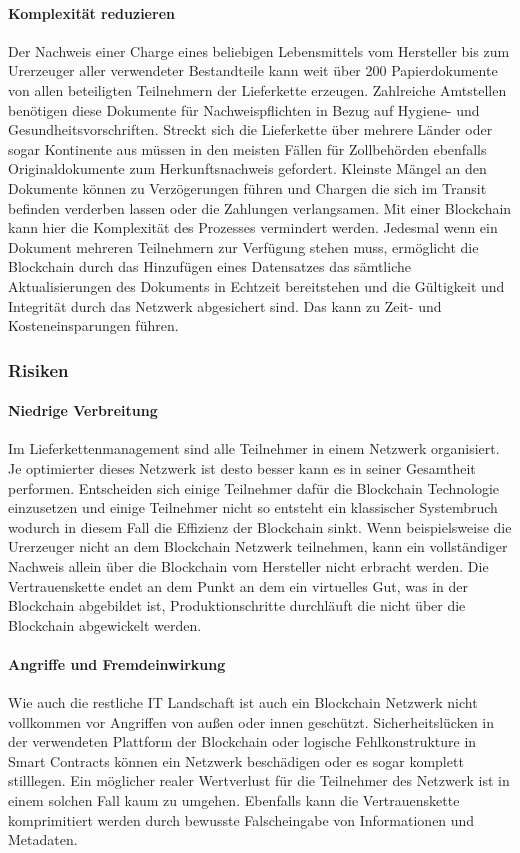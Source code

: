 \paragraph{Komplexität reduzieren}
Der Nachweis einer Charge eines beliebigen Lebensmittels vom Hersteller bis zum Urerzeuger aller verwendeter Bestandteile kann weit über 200 Papierdokumente von allen beteiligten Teilnehmern der Lieferkette erzeugen. Zahlreiche Amtstellen benötigen diese Dokumente für Nachweispflichten in Bezug auf Hygiene- und Gesundheitsvorschriften. Streckt sich die Lieferkette über mehrere Länder oder sogar Kontinente aus müssen in den meisten Fällen für Zollbehörden ebenfalls Originaldokumente zum Herkunftsnachweis gefordert. Kleinste Mängel an den Dokumente können zu Verzögerungen führen und Chargen die sich im Transit befinden verderben lassen oder die Zahlungen verlangsamen. Mit einer Blockchain kann hier die Komplexität des Prozesses vermindert werden. Jedesmal wenn ein Dokument mehreren Teilnehmern zur Verfügung stehen muss, ermöglicht die Blockchain durch das Hinzufügen eines Datensatzes das sämtliche Aktualisierungen des Dokuments in Echtzeit bereitstehen und die Gültigkeit und Integrität durch das Netzwerk abgesichert sind. Das kann zu Zeit- und Kosteneinsparungen führen.

\subsubsection{Risiken}
\paragraph{Niedrige Verbreitung}
Im Lieferkettenmanagement sind alle Teilnehmer in einem Netzwerk organisiert. Je optimierter dieses Netzwerk ist desto besser kann es in seiner Gesamtheit performen. Entscheiden sich einige Teilnehmer dafür die Blockchain Technologie einzusetzen und einige Teilnehmer nicht so entsteht ein klassischer Systembruch wodurch in diesem Fall die Effizienz der Blockchain sinkt. Wenn beispielsweise die Urerzeuger nicht an dem Blockchain Netzwerk teilnehmen, kann ein vollständiger Nachweis allein über die Blockchain vom Hersteller nicht erbracht werden. Die Vertrauenskette endet an dem Punkt an dem ein virtuelles Gut, was in der Blockchain abgebildet ist, Produktionschritte durchläuft die nicht über die Blockchain abgewickelt werden. 

\paragraph{Angriffe und Fremdeinwirkung}
Wie auch die restliche IT Landschaft ist auch ein Blockchain Netzwerk nicht vollkommen vor Angriffen von außen oder innen geschützt. Sicherheitslücken in der verwendeten Plattform der Blockchain oder logische Fehlkonstrukture in Smart Contracts können ein Netzwerk beschädigen oder es sogar komplett stilllegen. Ein möglicher realer Wertverlust für die Teilnehmer des Netzwerk ist in einem solchen Fall kaum zu umgehen. Ebenfalls kann die Vertrauenskette komprimitiert werden durch bewusste Falscheingabe von Informationen und Metadaten. 

